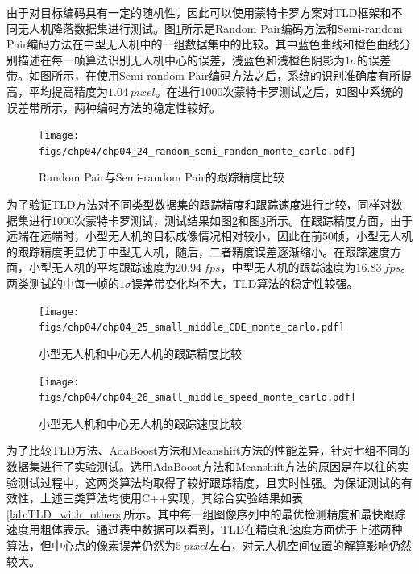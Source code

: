 由于对目标编码具有一定的随机性，因此可以使用蒙特卡罗方案对TLD框架和不同无人机降落数据集进行测试。图\ref{fig:chp04_24_random_semi_random_monte_carlo}所示是Random Pair编码方法和Semi-random Pair编码方法在中型无人机中的一组数据集中的比较。其中蓝色曲线和橙色曲线分别描述在每一帧算法识别无人机中心的误差，浅蓝色和浅橙色阴影为$1\sigma$的误差带。如图所示，在使用Semi-random Pair编码方法之后，系统的识别准确度有所提高，平均提高精度为$1.04\ pixel$。在进行1000次蒙特卡罗测试之后，如图中系统的误差带所示，两种编码方法的稳定性较好。

\begin{figure}[ht]   
	\centering
	\texttt{[image: figs/chp04/chp04\_24\_random\_semi\_random\_monte\_carlo.pdf]}
	\caption{Random Pair与Semi-random Pair的跟踪精度比较}
	\label{fig:chp04_24_random_semi_random_monte_carlo}
\end{figure}

为了验证TLD方法对不同类型数据集的跟踪精度和跟踪速度进行比较，同样对数据集进行1000次蒙特卡罗测试，测试结果如图\ref{fig:chp04_25_small_middle_CDE_monte_carlo}和图\ref{fig:chp04_26_small_middle_speed_monte_carlo}所示。在跟踪精度方面，由于远端在远端时，小型无人机的目标成像情况相对较小，因此在前50帧，小型无人机的跟踪精度明显优于中型无人机，随后，二者精度误差逐渐缩小。在跟踪速度方面，小型无人机的平均跟踪速度为$20.94\ fps$，中型无人机的跟踪速度为$16.83\ fps$。两类测试的中每一帧的$1\sigma$误差带变化均不大，TLD算法的稳定性较强。

\begin{figure}[ht]   
	\centering
	\texttt{[image: figs/chp04/chp04\_25\_small\_middle\_CDE\_monte\_carlo.pdf]}
	\caption{小型无人机和中心无人机的跟踪精度比较}
	\label{fig:chp04_25_small_middle_CDE_monte_carlo}
\end{figure}

\begin{figure}[ht]   
	\centering
	\texttt{[image: figs/chp04/chp04\_26\_small\_middle\_speed\_monte\_carlo.pdf]}
	\caption{小型无人机和中心无人机的跟踪速度比较}
	\label{fig:chp04_26_small_middle_speed_monte_carlo}
\end{figure}

为了比较TLD方法、AdaBoost方法和Meanshift方法的性能差异，针对七组不同的数据集进行了实验测试。选用AdaBoost方法和Meanshift方法的原因是在以往的实验测试过程中，这两类算法均取得了较好跟踪精度，且实时性强。为保证测试的有效性，上述三类算法均使用C++实现，其综合实验结果如表\ref{lab:TLD_with_others}所示。其中每一组图像序列中的最优检测精度和最快跟踪速度用粗体表示。通过表中数据可以看到，TLD在精度和速度方面优于上述两种算法，但中心点的像素误差仍然为$5\ pixel$左右，对无人机空间位置的解算影响仍然较大。

